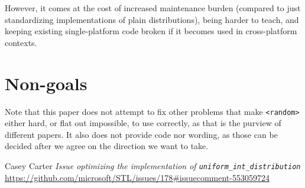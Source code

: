 \documentclass{wg21}
\begin{document}
However, it comes at the cost of increased maintenance burden (compared
to just standardizing implementations of plain distributions), being
harder to teach, and keeping existing single-platform code broken if it
becomes used in cross-platform contexts.



\hypertarget{non-goals}{%
    \section{Non-goals}\label{non-goals}}

Note that this paper does not attempt to fix other problems that make
\texttt{<random>} either hard, or flat out impossible, to use correctly,
as that is the purview of different papers. It also does not provide code
nor wording, as those can be decided after we agree on the direction we
want to take.


\begin{thebibliography}{9}

    Casey Carter
    \emph{Issue optimizing the implementation of \texttt{uniform_int_distribution}}
    \url{https://github.com/microsoft/STL/issues/178#issuecomment-553059724}

\end{thebibliography}
\end{document}
